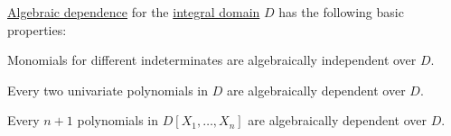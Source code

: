 \begin{proposition}\label{thm:def:algebraic_dependence}
  \hyperref[def:algebraic_dependence]{Algebraic dependence} for the \hyperref[def:integral_domain]{integral domain} \( D \) has the following basic properties:
  \begin{thmenum}
     Monomials for different indeterminates are algebraically independent over \( D \).

     Every two univariate polynomials in \( D \) are algebraically dependent over \( D \).

     Every \( n + 1 \) polynomials in \( D[X_1, \ldots, X_n] \) are algebraically dependent over \( D \).
  \end{thmenum}
\end{proposition}
